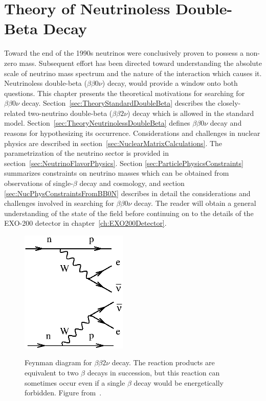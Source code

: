 \renewcommand{\thechapter}{2}
\chapter{Theory of Neutrinoless Double-Beta Decay}
\label{ch:BB0NTheory}

Toward the end of the 1990s neutrinos were conclusively proven to possess a non-zero mass.  Subsequent effort has been directed toward understanding the absolute scale of neutrino mass spectrum and the nature of the interaction which causes it.  Neutrinoless double-beta ($\beta\beta 0\nu$) decay, would provide a window onto both questions.  This chapter presents the theoretical motivations for searching for $\beta\beta 0\nu$ decay.  Section~\ref{sec:TheoryStandardDoubleBeta} describes the closely-related two-neutrino double-beta ($\beta\beta 2\nu$) decay which is allowed in the standard model.  Section~\ref{sec:TheoryNeutrinolessDoubleBeta} defines $\beta\beta 0\nu$ decay and reasons for hypothesizing its occurrence.  Considerations and challenges in nuclear physics are described in section~\ref{sec:NuclearMatrixCalculations}.  The parametrization of the neutrino sector is provided in section~\ref{sec:NeutrinoFlavorPhysics}.  Section \ref{sec:ParticlePhysicsConstraints} summarizes constraints on neutrino masses which can be obtained from observations of single-$\beta$ decay and cosmology, and section \ref{sec:NucPhysConstraintsFromBB0N} describes in detail the considerations and challenges involved in searching for $\beta\beta 0\nu$ decay.  The reader will obtain a general understanding of the state of the field before continuing on to the details of the EXO-200 detector in chapter~\ref{ch:EXO200Detector}.

\begin{figure}
\begin{center}
\includegraphics[keepaspectratio=true,width=2in]{Avignone_fig02a.eps}
\end{center}
\renewcommand{\baselinestretch}{1}
\small\normalsize
\begin{quote}
\caption{Feynman diagram for $\beta\beta 2 \nu$ decay.  The reaction products are equivalent to two $\beta$ decays in succession, but this reaction can sometimes occur even if a single $\beta$ decay would be energetically forbidden.  Figure from~\cite{RMPbb0n}.}
\label{fig:FeynmanBetaBeta2Nu}
\end{quote}
\end{figure}
\renewcommand{\baselinestretch}{2}
\small\normalsize

